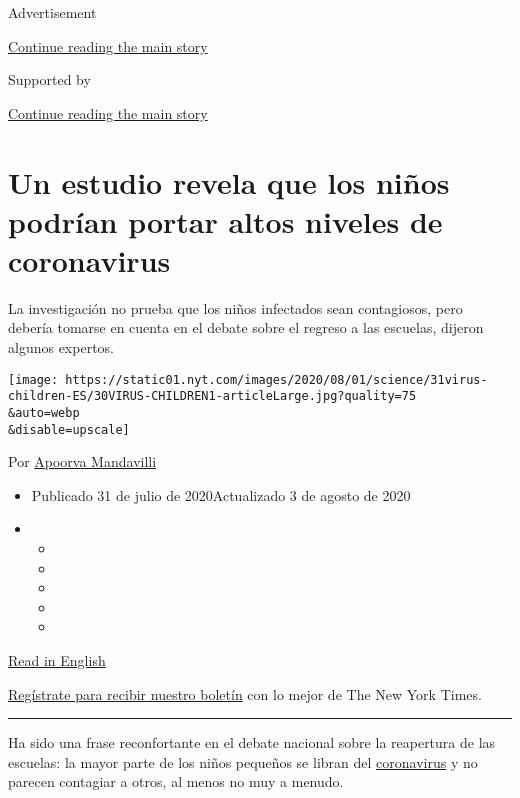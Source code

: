 Advertisement

\protect\hyperlink{after-top}{Continue reading the main story}

Supported by

\protect\hyperlink{after-sponsor}{Continue reading the main story}

\hypertarget{un-estudio-revela-que-los-niuxf1os-podruxedan-portar-altos-niveles-de-coronavirus}{%
\section{Un estudio revela que los niños podrían portar altos niveles de
coronavirus}\label{un-estudio-revela-que-los-niuxf1os-podruxedan-portar-altos-niveles-de-coronavirus}}

La investigación no prueba que los niños infectados sean contagiosos,
pero debería tomarse en cuenta en el debate sobre el regreso a las
escuelas, dijeron algunos expertos.

\texttt{[image: https://static01.nyt.com/images/2020/08/01/science/31virus-children-ES/30VIRUS-CHILDREN1-articleLarge.jpg?quality=75\\\&auto=webp\\\&disable=upscale]}

Por \href{https://www.nytimes.com/by/apoorva-mandavilli}{Apoorva
Mandavilli}

\begin{itemize}
\item
  Publicado 31 de julio de 2020Actualizado 3 de agosto de 2020
\item
  \begin{itemize}
  \item
  \item
  \item
  \item
  \item
  \end{itemize}
\end{itemize}

\href{https://www.nytimes.com/2020/07/30/health/coronavirus-children.html}{Read
in English}

\href{https://www.nytimes.com/newsletters/el-times}{Regístrate para
recibir nuestro boletín} con lo mejor de The New York Times.

\begin{center}\rule{0.5\linewidth}{\linethickness}\end{center}

Ha sido una frase reconfortante en el debate nacional sobre la
reapertura de las escuelas: la mayor parte de los niños pequeños se
libran del
\href{https://www.nytimes.com/es/interactive/2020/espanol/mundo/coronavirus-en-estados-unidos.html}{coronavirus}
y no parecen contagiar a otros, al menos no muy a menudo.

